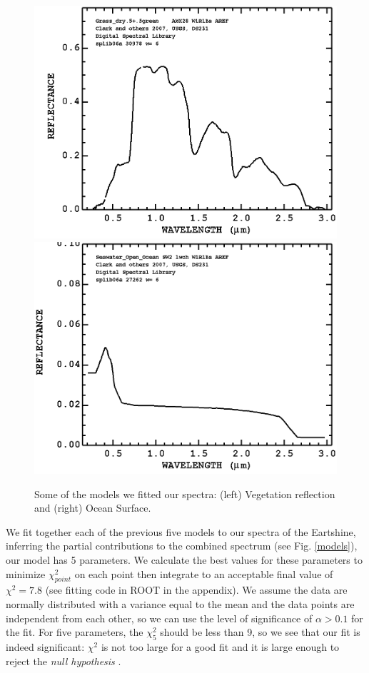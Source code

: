 \begin{figure}[htb]
\begin{center}
\includegraphics[scale=0.22]{figs/green.png}
\includegraphics[scale=0.22]{figs/sea.png}
\caption{Some of the models we fitted our spectra: (left) Vegetation reflection
and (right) Ocean Surface.}
\label{veg}
\end{center}
\end{figure}

 We fit together each of the previous five models to our spectra of the
Eartshine, inferring the partial contributions to
the combined spectrum (see Fig. \ref{models}), \ie our model has 5 parameters. We calculate the best values for these parameters
to minimize $\chi^2_{point}$ on each point then integrate to an acceptable
final value of  $\chi^2=7.8$ (see fitting code in ROOT in the appendix). We
assume the data are normally distributed with a variance equal to the mean and
the data points are independent from each other, so we can use the level of
significance of $\alpha >0.1$ for the fit. For five parameters, the $\chi^2_5$
should be less than 9, so we see that our fit is indeed significant: $\chi^2$ is
not too large for a good fit and it is large enough to reject the {\it null
hypothesis} \cite{writeup}.

